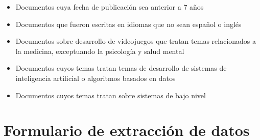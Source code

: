 \begin{itemize}
    \item Documentos cuya fecha de publicación sea anterior a 7 años
    \item Documentos que fueron escritas en idiomas que no sean español o inglés
    \item Documentos sobre desarrollo de videojuegos que tratan temas relacionados a la medicina, exceptuando la psicología y salud mental
    \item Documentos cuyos temas tratan temas de desarrollo de sistemas de inteligencia artificial o algoritmos basados en datos
    \item Documentos cuyos temas tratan sobre sistemas de bajo nivel
\end{itemize}

\section{Formulario de extracción de datos}


